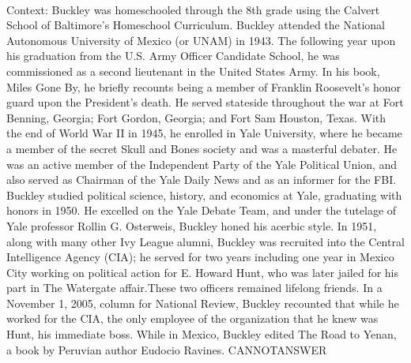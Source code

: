 \documentclass[11pt,a4paper, onecolumn]{article}
\begin{document}
\\ Context: Buckley was homeschooled through the 8th grade using the Calvert School of Baltimore's Homeschool Curriculum. Buckley attended the National Autonomous University of Mexico (or UNAM) in 1943. The following year upon his graduation from the U.S. Army Officer Candidate School, he was commissioned as a second lieutenant in the United States Army. In his book, Miles Gone By, he briefly recounts being a member of Franklin Roosevelt's honor guard upon the President's death. He served stateside throughout the war at Fort Benning, Georgia; Fort Gordon, Georgia; and Fort Sam Houston, Texas. With the end of World War II in 1945, he enrolled in Yale University, where he became a member of the secret Skull and Bones society and was a masterful debater. He was an active member of the Independent Party of the Yale Political Union, and also served as Chairman of the Yale Daily News and as an informer for the FBI. Buckley studied political science, history, and economics at Yale, graduating with honors in 1950. He excelled on the Yale Debate Team, and under the tutelage of Yale professor Rollin G. Osterweis, Buckley honed his acerbic style. In 1951, along with many other Ivy League alumni, Buckley was recruited into the Central Intelligence Agency (CIA); he served for two years including one year in Mexico City working on political action for E. Howard Hunt, who was later jailed for his part in The Watergate affair.These two officers remained lifelong friends. In a November 1, 2005, column for National Review, Buckley recounted that while he worked for the CIA, the only employee of the organization that he knew was Hunt, his immediate boss. While in Mexico, Buckley edited The Road to Yenan, a book by Peruvian author Eudocio Ravines. CANNOTANSWER
\end{document}

